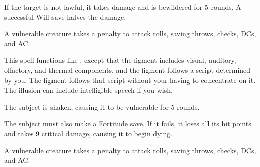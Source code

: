 \spellrng{\rngmed}
\begin{spelleffect}
  If the target is not lawful, it takes damage and is bewildered for 5 rounds. A successful Will save halves the damage.
\end{spelleffect}
\begin{spellnotes}
  A vulnerable creature takes a  penalty to attack rolls, saving throws, checks, DCs, and AC.
\end{spellnotes}

\begin{spelleffect}
  This spell functions like , except that the figment includes visual, auditory, olfactory, and thermal components, and the figment follows a script determined by you. The figment follows that script without your having to concentrate on it. The illusion can include intelligible speech if you wish.
\end{spelleffect}

\spellrng{\rngmed}
\begin{spelleffect}
  The subject is shaken, causing it to be vulnerable for 5 rounds.
\end{spelleffect}
\begin{spellblood}
  The subject must also make a Fortitude save. If it fails, it loses all its hit points and takes 9 critical damage, causing it to begin dying.
\end{spellblood}
\begin{spellnotes}
  A vulnerable creature takes a  penalty to attack rolls, saving throws, checks, DCs, and AC.
\end{spellnotes}

